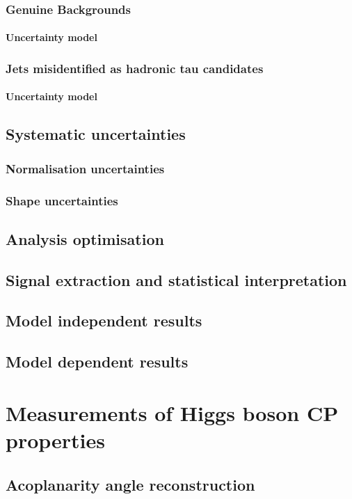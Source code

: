 \documentclass[11pt, a4paper, twoside]{report}
\begin{document}
\subsection{Genuine Backgrounds}
\subsubsection{Uncertainty model}
\subsection{Jets misidentified as hadronic tau candidates}
\subsubsection{Uncertainty model}
\section{Systematic uncertainties}
\subsection{Normalisation uncertainties}
\subsection{Shape uncertainties}
\section{Analysis optimisation}
\section{Signal extraction and statistical interpretation}
\section{Model independent results}
\section{Model dependent results}

\chapter{Measurements of Higgs boson CP properties}
\section{Acoplanarity angle reconstruction}
\end{document}
